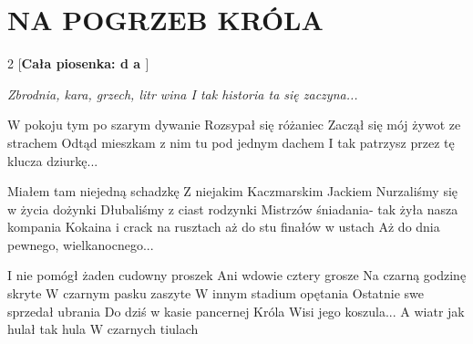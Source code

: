 \documentclass[../../../songbook.tex]{subfiles}
\begin{document}
\TabPositions{8cm} %
\section*{NA POGRZEB KRÓLA}
{}
\vspace{0.1cm}
\setlength{\columnsep}{0.1cm}
\begin{multicols}{2}
[\textbf{Cała piosenka: {\color{red}  d a  }} 
]
{\footnotesize
\textit{Zbrodnia, kara, grzech, litr wina \newline
I tak historia ta się zaczyna... \newline}

W pokoju tym po szarym dywanie \newline
Rozsypał się różaniec \newline
Zaczął się mój żywot ze strachem \newline
Odtąd mieszkam z nim tu pod jednym dachem \newline
I tak patrzysz przez tę klucza dziurkę... \newline

Miałem tam niejedną schadzkę \newline
Z niejakim Kaczmarskim Jackiem \newline
Nurzaliśmy się w życia dożynki \newline
Dłubaliśmy z ciast rodzynki \newline
Mistrzów śniadania- tak żyła nasza kompania \newline
Kokaina i crack na rusztach  \newline
aż do stu finałów w ustach \newline
Aż do dnia pewnego, wielkanocnego... \newline

I nie pomógł żaden cudowny proszek \newline
Ani wdowie cztery grosze \newline
Na czarną godzinę skryte \newline
W czarnym pasku zaszyte \newline
W innym stadium opętania \newline
Ostatnie swe sprzedał ubrania \newline
Do dziś w kasie pancernej Króla \newline
Wisi jego koszula... \newline
A wiatr jak hulał tak hula \newline
W czarnych tiulach \newline

}
\end{multicols}
\end{document}
